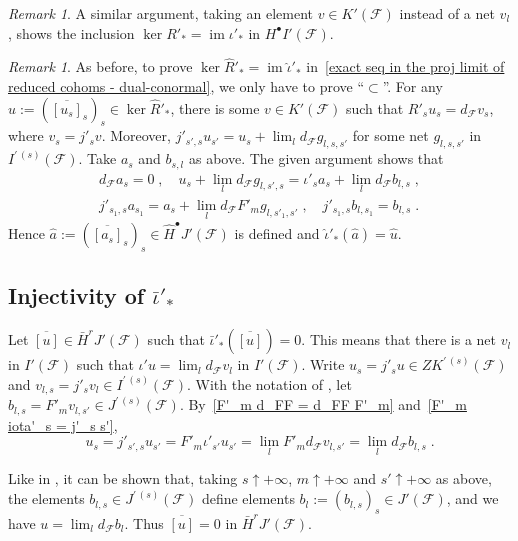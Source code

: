 \documentclass{memo-l}
\theoremstyle{plain}
\theoremstyle{definition}
\theoremstyle{remark}
\newtheorem{rem}[thm]{Remark}
\newcommand{\FF}{\mathcal{F}}
\newcommand{\im}{\operatorname{im}}
\numberwithin{section}{chapter}
\numberwithin{equation}{section}%
\begin{document}
\begin{rem}\label{r: ker R'_* = im iota'_*}
A similar argument, taking an element $v\in K'(\FF)$ instead of a net $v_l$, shows the inclusion $\ker R'_*=\im\iota'_*$ in $H^\bullet I'(\FF)$.
\end{rem}

\begin{rem}\label{r: ker widehat R'_* = im hat iota'_*}
As before, to prove $\ker\widehat R'_*=\im\hat\iota'_*$ in~\eqref{exact seq in the proj limit of reduced cohoms - dual-conormal}, we only have to prove ``$\subset$''. For any $\hat u:=(\overline{[u_s]}_s)_s\in\ker\widehat R'_*$, there is some $v\in K'(\FF)$ such that $R'_su_s=d_\FF v_s$, where $v_s=j'_sv$. Moreover, $j'_{s',s}u_{s'}=u_s+\lim_ld_\FF g_{l,s,s'}$ for some net $g_{l,s,s'}$ in $I^{\prime\,(s)}(\FF)$. Take $a_s$ and $b_{s,l}$ as above. The given argument shows that
\begin{gather*}
d_\FF a_s=0\;,\quad u_s+\lim_ld_\FF g_{l,s',s}=\iota'_sa_s+\lim_ld_\FF b_{l,s}\;,\\
j'_{s_1,s}a_{s_1}=a_s+\lim_ld_\FF F'_mg_{l,s'_1,s'}\;,\quad j'_{s_1,s}b_{l,s_1}=b_{l,s}\;.
\end{gather*}
Hence $\hat a:=(\overline{[a_s]}_s)_s\in\widehat H^\bullet J'(\FF)$ is defined and $\hat\iota'_*(\hat a)=\hat u$.
\end{rem}



\subsection{Injectivity of $\bar\iota'_*$}\label{ss: ker bar iota'_* = 0}

Let $\overline{[u]}\in\bar H^rJ'(\FF)$ such that $\bar\iota'_*(\overline{[u]})=0$. This means that there is a net $v_l$ in $I'(\FF)$ such that $\iota'u=\lim_ld_\FF v_l$ in $I'(\FF)$. Write $u_s=j'_su\in ZK^{\prime\,(s)}(\FF)$ and $v_{l,s}=j'_sv_l\in I^{\prime\,(s)}(\FF)$. With the notation of , let $b_{l,s}=F'_mv_{l,s'}\in J^{\prime\,(s)}(\FF)$. By~\eqref{F'_m d_FF = d_FF F'_m} and~\eqref{F'_m iota'_s = j'_s s'},
\[
u_s=j'_{s',s}u_{s'}=F'_m\iota'_{s'}u_{s'}=\lim_lF'_md_\FF v_{l,s'}=\lim_ld_\FF b_{l,s}\;.
\]

Like in , it can be shown that, taking $s\uparrow+\infty$, $m\uparrow+\infty$ and $s'\uparrow+\infty$ as above, the elements $b_{l,s}\in J^{\prime\,(s)}(\FF)$ define elements $b_l:=(b_{l,s})_s\in J'(\FF)$, and we have $u=\lim_ld_\FF b_l$. Thus $\overline{[u]}=0$ in $\bar H^rJ'(\FF)$.
\end{document}
